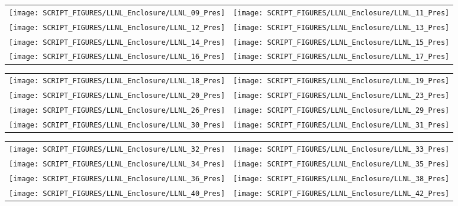 \begin{figure}[p]
\begin{tabular*}{\textwidth}{l@{\extracolsep{\fill}}r}
\texttt{[image: SCRIPT\_FIGURES/LLNL\_Enclosure/LLNL\_09\_Pres]} &
\texttt{[image: SCRIPT\_FIGURES/LLNL\_Enclosure/LLNL\_11\_Pres]} \\
\texttt{[image: SCRIPT\_FIGURES/LLNL\_Enclosure/LLNL\_12\_Pres]} &
\texttt{[image: SCRIPT\_FIGURES/LLNL\_Enclosure/LLNL\_13\_Pres]} \\
\texttt{[image: SCRIPT\_FIGURES/LLNL\_Enclosure/LLNL\_14\_Pres]} &
\texttt{[image: SCRIPT\_FIGURES/LLNL\_Enclosure/LLNL\_15\_Pres]} \\
\texttt{[image: SCRIPT\_FIGURES/LLNL\_Enclosure/LLNL\_16\_Pres]} &
\texttt{[image: SCRIPT\_FIGURES/LLNL\_Enclosure/LLNL\_17\_Pres]}
\end{tabular*}
\label{LLNL_Enclosure_Pres_2}
\end{figure}

\begin{figure}[p]
\begin{tabular*}{\textwidth}{l@{\extracolsep{\fill}}r}
\texttt{[image: SCRIPT\_FIGURES/LLNL\_Enclosure/LLNL\_18\_Pres]} &
\texttt{[image: SCRIPT\_FIGURES/LLNL\_Enclosure/LLNL\_19\_Pres]} \\
\texttt{[image: SCRIPT\_FIGURES/LLNL\_Enclosure/LLNL\_20\_Pres]} &
\texttt{[image: SCRIPT\_FIGURES/LLNL\_Enclosure/LLNL\_23\_Pres]} \\
\texttt{[image: SCRIPT\_FIGURES/LLNL\_Enclosure/LLNL\_26\_Pres]} &
\texttt{[image: SCRIPT\_FIGURES/LLNL\_Enclosure/LLNL\_29\_Pres]} \\
\texttt{[image: SCRIPT\_FIGURES/LLNL\_Enclosure/LLNL\_30\_Pres]} &
\texttt{[image: SCRIPT\_FIGURES/LLNL\_Enclosure/LLNL\_31\_Pres]}
\end{tabular*}
\label{LLNL_Enclosure_Pres_3}
\end{figure}

\begin{figure}[p]
\begin{tabular*}{\textwidth}{l@{\extracolsep{\fill}}r}
\texttt{[image: SCRIPT\_FIGURES/LLNL\_Enclosure/LLNL\_32\_Pres]} &
\texttt{[image: SCRIPT\_FIGURES/LLNL\_Enclosure/LLNL\_33\_Pres]} \\
\texttt{[image: SCRIPT\_FIGURES/LLNL\_Enclosure/LLNL\_34\_Pres]} &
\texttt{[image: SCRIPT\_FIGURES/LLNL\_Enclosure/LLNL\_35\_Pres]} \\
\texttt{[image: SCRIPT\_FIGURES/LLNL\_Enclosure/LLNL\_36\_Pres]} &
\texttt{[image: SCRIPT\_FIGURES/LLNL\_Enclosure/LLNL\_38\_Pres]} \\
\texttt{[image: SCRIPT\_FIGURES/LLNL\_Enclosure/LLNL\_40\_Pres]} &
\texttt{[image: SCRIPT\_FIGURES/LLNL\_Enclosure/LLNL\_42\_Pres]}
\end{tabular*}
\label{LLNL_Enclosure_Pres_4}
\end{figure}

